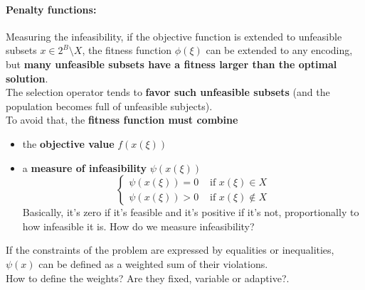 \newpage

\paragraph{Penalty functions:} Measuring the infeasibility, if the objective function is extended to unfeasible subsets $x \in 2^B \setminus X$, the fitness function $\phi (\xi)$ can be extended to any encoding, but \textbf{many unfeasible subsets have a fitness larger than the optimal solution}.\\

The selection operator tends to \textbf{favor such unfeasible subsets} (and the population becomes full of unfeasible subjects).\\

To avoid that, the \textbf{fitness function must combine}
\begin{itemize}
	\item the \textbf{objective value} $f (x (\xi))$
	\item a \textbf{measure of infeasibility} $\psi (x (\xi))$
	$$\begin{cases}
		\psi (x (\xi)) = 0 & \text{ if } x (\xi) \in X \\
		\psi (x (\xi)) > 0 & \text{ if } x (\xi) \notin X
	\end{cases}$$
	Basically, it's zero if it's feasible and it's positive if it's not, proportionally to how infeasible it is. How do we measure infeasibility?
\end{itemize}

If the constraints of the problem are expressed by equalities or inequalities, $\psi (x)$ can be defined as a weighted sum of their violations.\\
How to define the weights? Are they fixed, variable or adaptive?.\\

\newpage

